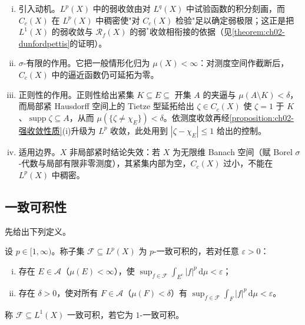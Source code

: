 \documentclass[../../main.tex]{subfiles}%
\begin{document}
\begin{remark}\label{remark:ch02-Cc稠密}
\begin{enumerate}[(i)]
\item 引入动机。$L^p(X)$ 中的弱收敛由对 $L^q(X)$ 中试验函数的积分刻画，而 $C_c(X)$ 在 $L^p(X)$ 中稠密使"对 $C_c(X)$ 检验"足以确定弱极限；这正是把 $L^1(X)$ 的弱收敛与 $\mathscr R_f(X)$ 的弱$^*$收敛相衔接的依据（见\cref{theorem:ch02-dunfordpettis}的证明）。
\item $\sigma$-有限的作用。它把一般情形化归为 $\mu(X)<\infty$：对测度空间作截断后，$C_c(X)$ 中的逼近函数仍可延拓为零。
\item 正则性的作用。正则性给出紧集 $K\subseteq E\subseteq$ 开集 $A$ 的夹逼与 $\mu(A\setminus K)<\delta$，而局部紧 Hausdorff 空间上的 Tietze 型延拓给出 $\zeta\in C_c(X)$ 使 $\zeta=1$ 于 $K$、$\operatorname{supp}\zeta\subseteq A$，从而 $\mu(\{\zeta\neq\chi_E\})<\delta$。依测度收敛再经\cref{proposition:ch02-强收敛性质}(i)升级为 $L^p$ 收敛，此处用到 $|\zeta-\chi_E|\leqslant1$ 给出的控制。
\item 适用边界。$X$ 非局部紧时结论失效：若 $X$ 为无限维 Banach 空间（赋 Borel $\sigma$-代数与局部有限非零测度），其紧集内部为空，$C_c(X)$ 过小，不能在 $L^p(X)$ 中稠密。
\end{enumerate}
\end{remark}

\subsection{一致可积性}\label{subsection:ch02-一致可积}

先给出下列定义。

\begin{definition}\label{definition:ch02-p一致可积}\label{definition:ch02-一致可积}
设 $p\in[1,\infty)$。称子集 $\mathscr F\subseteq L^p(X)$ 为 $p$-一致可积的，若对任意 $\varepsilon>0$：
\begin{enumerate}[(i)]
\item 存在 $E\in\mathscr A$（$\mu(E)<\infty$），使 $\sup_{f\in\mathscr F}\int_{E^c}|f|^p\,\mathrm{d}\mu<\varepsilon$；
\item 存在 $\delta>0$，使对所有 $F\in\mathscr A$（$\mu(F)<\delta$）有 $\sup_{f\in\mathscr F}\int_F|f|^p\,\mathrm{d}\mu<\varepsilon$。
\end{enumerate}
称 $\mathscr F\subseteq L^1(X)$ 一致可积，若它为 $1$-一致可积。
\end{definition}
\end{document}

